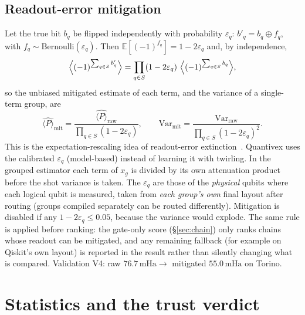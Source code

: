 \documentclass[10pt,a4paper]{article}
\newcommand{\mHa}{\,\mathrm{mHa}}
\begin{document}
\subsection{Readout-error mitigation}\label{sec:mit}
Let the true bit $b_q$ be flipped independently with probability $\varepsilon_q$: $b'_q=b_q\oplus f_q$, with $f_q\sim\mathrm{Bernoulli}(\varepsilon_q)$. Then $\mathbb E[(-1)^{f_q}]=1-2\varepsilon_q$ and, by independence,
\begin{equation}
\Bigl\langle (-1)^{\sum_{q\in S}b'_q}\Bigr\rangle=\prod_{q\in S}(1-2\varepsilon_q)\ \Bigl\langle(-1)^{\sum_{q\in S}b_q}\Bigr\rangle,
\end{equation}
so the unbiased mitigated estimate of each term, and the variance of a single-term group, are
\begin{equation}
\widehat{\langle P\rangle}_{\mathrm{mit}}=\frac{\widehat{\langle P\rangle}_{\mathrm{raw}}}{\prod_{q\in S}(1-2\varepsilon_q)},\qquad
\mathrm{Var}_{\mathrm{mit}}=\frac{\mathrm{Var}_{\mathrm{raw}}}{\prod_{q\in S}(1-2\varepsilon_q)^2}.
\end{equation}
This is the expectation-rescaling idea of readout-error extinction~\cite{vandenBerg2022}. Quantivex uses the calibrated $\varepsilon_q$ (model-based) instead of learning it with twirling. In the grouped estimator each term of $x_g$ is divided by its own attenuation product before the shot variance is taken. The $\varepsilon_q$ are those of the \emph{physical} qubits where each logical qubit is measured, taken from \emph{each group's own} final layout after routing (groups compiled separately can be routed differently). Mitigation is disabled if any $1-2\varepsilon_q\le0.05$, because the variance would explode. The same rule is applied before ranking: the gate-only score (\S\ref{sec:chain}) only ranks chains whose readout can be mitigated, and any remaining fallback (for example on Qiskit's own layout) is reported in the result rather than silently changing what is compared. Validation V4: raw $76.7\mHa\to$ mitigated $55.0\mHa$ on Torino.

\section{Statistics and the trust verdict}\label{sec:stats}
\end{document}
